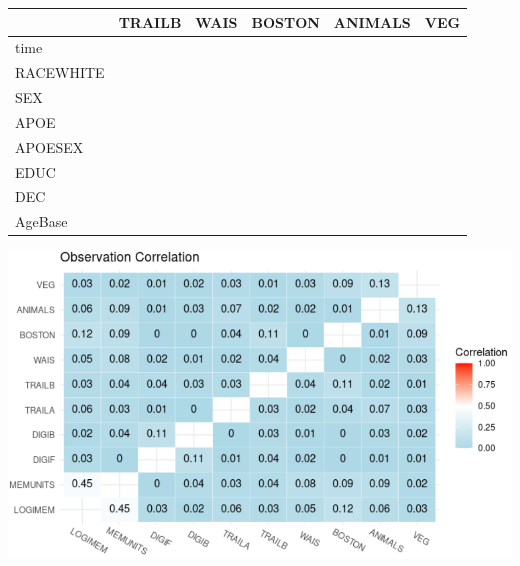 \documentclass[
]{article}
\begin{document}
\begin{longtable}[t]{l|l|l|l|l|l}
\hline
  & TRAILB & WAIS & BOSTON & ANIMALS & VEG\\
\hline
time & \cellcolor{green}{-0.46 (-0.65, -0.25)} & \cellcolor{green}{-0.19 (-0.34, -0.02)} & \cellcolor{white}{-0.06 (-0.28, 0.12)} & \cellcolor{green}{-0.20 (-0.37, -0.02)} & \cellcolor{white}{-0.13 (-0.32, 0.05)}\\
\hline
RACEWHITE & \cellcolor{white}{-0.06 (-0.24, 0.11)} & \cellcolor{green}{-0.24 (-0.36, -0.11)} & \cellcolor{white}{-0.13 (-0.28, 0.02)} & \cellcolor{green}{-0.31 (-0.45, -0.18)} & \cellcolor{green}{-0.30 (-0.44, -0.15)}\\
\hline
SEX & \cellcolor{white}{0.06 (-0.07, 0.19)} & \cellcolor{white}{0.02 (-0.08, 0.12)} & \cellcolor{green}{-0.16 (-0.28, -0.03)} & \cellcolor{white}{-0.08 (-0.20, 0.03)} & \cellcolor{green}{-0.16 (-0.27, -0.05)}\\
\hline
APOE & \cellcolor{white}{-0.05 (-0.23, 0.12)} & \cellcolor{white}{-0.02 (-0.16, 0.10)} & \cellcolor{white}{-0.05 (-0.22, 0.13)} & \cellcolor{white}{-0.11 (-0.27, 0.05)} & \cellcolor{white}{-0.13 (-0.30, 0.03)}\\
\hline
APOESEX & \cellcolor{white}{-0.18 (-0.40, 0.05)} & \cellcolor{white}{-0.15 (-0.31, 0.03)} & \cellcolor{white}{0.04 (-0.19, 0.25)} & \cellcolor{white}{-0.04 (-0.24, 0.17)} & \cellcolor{white}{0.04 (-0.16, 0.25)}\\
\hline
EDUC & \cellcolor{white}{-0.00 (-0.01, 0.00)} & \cellcolor{green}{-0.01 (-0.01, -0.00)} & \cellcolor{white}{-0.00 (-0.01, 0.01)} & \cellcolor{white}{0.00 (-0.01, 0.01)} & \cellcolor{white}{-0.00 (-0.01, 0.00)}\\
\hline
DEC & \cellcolor{green}{-0.27 (-0.41, -0.13)} & \cellcolor{green}{-0.31 (-0.42, -0.22)} & \cellcolor{green}{-0.33 (-0.45, -0.21)} & \cellcolor{green}{-0.14 (-0.26, -0.01)} & \cellcolor{green}{-0.20 (-0.33, -0.08)}\\
\hline
AgeBase & \cellcolor{green}{-0.01 (-0.02, -0.01)} & \cellcolor{green}{-0.01 (-0.02, -0.01)} & \cellcolor{green}{-0.01 (-0.02, -0.00)} & \cellcolor{green}{-0.01 (-0.02, -0.01)} & \cellcolor{green}{-0.01 (-0.02, -0.00)}\\
\hline
\end{longtable}

\includegraphics{img/NACCObsHeat.png}
\end{document}
